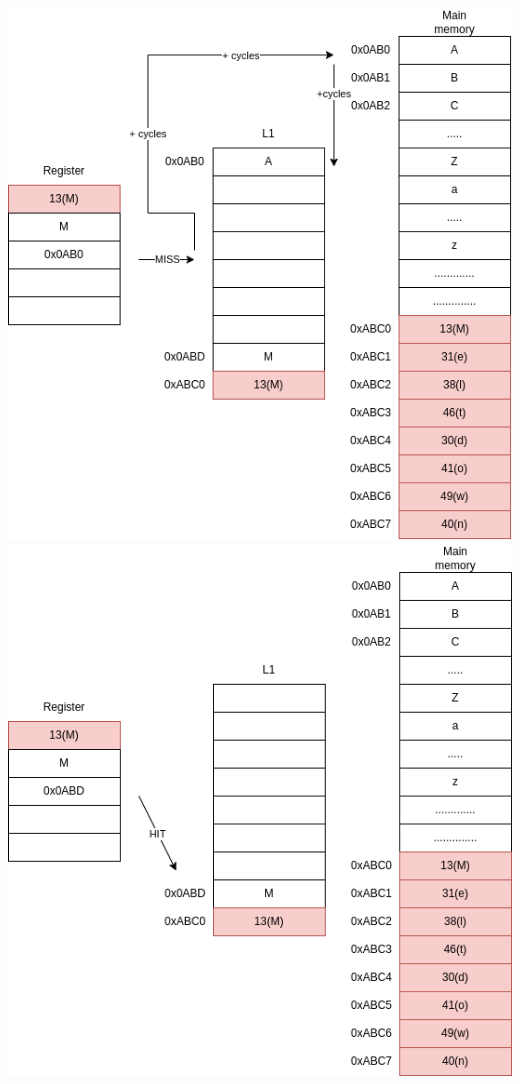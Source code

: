\includegraphics[scale=0.25]{img/meltdown-step-two.png}
\newline
\includegraphics[scale=0.25]{img/meltdown-step-four.png}
\newline

